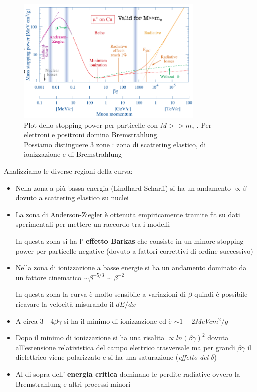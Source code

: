         \begin{figure}[H]
            \centering
            \includegraphics[width=0.8\textwidth,frame]{Chapters/images/Interazione_radiazione_materia/image-20220214171429817.png}
            \caption{Plot dello stopping power per particelle con $M>>m_e$ . Per elettroni e positroni domina Bremstrahlung.\\Possiamo distinguere 3 zone : zona di scattering elastico, di ionizzazione e di Bremstrahlung}
            \label{fig:betheblock}
        \end{figure}
    Analizziamo le diverse regioni della curva:
    \begin{itemize}
        \item Nella zona a più bassa energia (Lindhard-Scharff) si ha un andamento $\propto \beta$ dovuto a scattering elastico su nuclei

        \item La zona di Anderson-Ziegler è ottenuta empiricamente tramite fit su dati sperimentali per mettere un raccordo tra i modelli
        \begin{details}
            In questa zona si ha l' \textbf{effetto Barkas} che consiste in un minore stopping power per particelle negative (dovuto a fattori correttivi di ordine successivo)
        \end{details}


        \item Nella zona di ionizzazione a basse energie si ha un andamento dominato da un fattore cinematico $\sim \beta^{-5/3} \sim \beta^{-2}$

        In questa zona la curva è molto sensibile a variazioni di $\beta$ quindi è possibile ricavare la velocità misurando il $dE/dx$

        \item A circa 3 - 4$\beta \gamma$ si ha il minimo di ionizzazione ed è $\sim 1-2 MeV cm^2/g$

        \item Dopo il minimo di ionizzazione si ha una risalita $\propto ln(\beta \gamma)^2$ dovuta all'estensione relativistica del campo elettrico trasversale ma per grandi $\beta \gamma$ il dielettrico viene polarizzato e si ha una saturazione (\textit{effetto del $\delta$})

        \item Al di sopra dell' \textbf{energia critica} dominano le perdite radiative ovvero la Bremstrahlung e altri processi minori
    \end{itemize}
